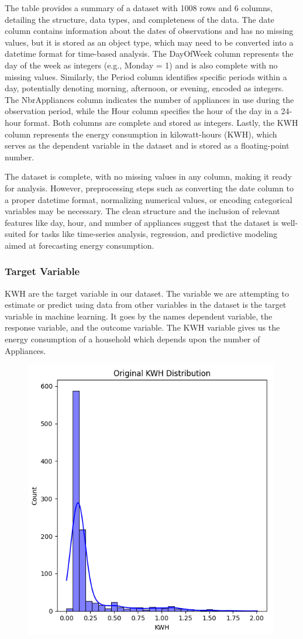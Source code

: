 \documentclass[english,12pt, titlepage]{article}
\begin{document}
	The table provides a summary of a dataset with 1008 rows and 6 columns, detailing the structure, data types, and completeness of the data. The date column contains information about the dates of observations and has no missing values, but it is stored as an object type, which may need to be converted into a datetime format for time-based analysis. The DayOfWeek column represents the day of the week as integers (e.g., Monday = 1) and is also complete with no missing values. Similarly, the Period column identifies specific periods within a day, potentially denoting morning, afternoon, or evening, encoded as integers. The NbrAppliances column indicates the number of appliances in use during the observation period, while the Hour column specifies the hour of the day in a 24-hour format. Both columns are complete and stored as integers. Lastly, the KWH column represents the energy consumption in kilowatt-hours (KWH), which serves as the dependent variable in the dataset and is stored as a floating-point number.
	
	The dataset is complete, with no missing values in any column, making it ready for analysis. However, preprocessing steps such as converting the date column to a proper datetime format, normalizing numerical values, or encoding categorical variables may be necessary. The clean structure and the inclusion of relevant features like day, hour, and number of appliances suggest that the dataset is well-suited for tasks like time-series analysis, regression, and predictive modeling aimed at forecasting energy consumption.
	
	\subsubsection{Target Variable}
	
	KWH are the target variable in our dataset. The variable we are attempting to estimate or predict using data from other variables in the dataset is the target variable in machine learning. It goes by the names dependent variable, the response variable, and the outcome variable.
	The KWH variable gives us the energy consumption of a household which depends upon the number of Appliances.
	
	\begin{figure}[!ht]
		\centering
		\includegraphics[width=0.5\linewidth]{fig1.png}
		\label{fig2}
	\end{figure}  
	
\end{document}
